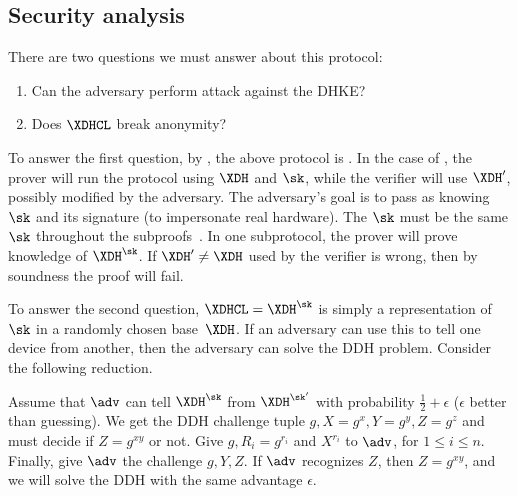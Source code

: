 \subsection{Security analysis}

There are two questions we must answer about this protocol:
\begin{enumerate}
  \item\label{DBSHW-MITM} Can the adversary perform  attack against 
    the \ac{DHKE}?
  \item\label{DBSHW-anon} Does \(\XDHCL\) break anonymity?
\end{enumerate}

To answer the first question,
by \textcite{Camenisch-phdthesis}, the above protocol is .
In the case of , the prover will run the protocol using \(\XDH\) and 
\(\sk\), while the verifier will use \(\XDH'\), possibly modified by the 
adversary.
The adversary's goal is to pass as knowing \(\sk\) and its signature (to 
impersonate real hardware).
The \(\sk\) must be the same \(\sk\) throughout the 
subproofs~\cite{Camenisch-phdthesis}.
In one subprotocol, the prover will prove knowledge of \(\XDH^{\sk}\).
If \(\XDH' \neq \XDH\) used by the verifier is wrong, then by soundness the 
proof will fail.

To answer the second question,
\(\XDHCL = \XDH^{\sk}\) is simply a representation of \(\sk\) in a randomly 
chosen base~\(\XDH\).
If an adversary can use this to tell one device from another, then the 
adversary can solve the \ac{DDH} problem.
Consider the following reduction.

Assume that \(\adv\) can tell \(\XDH^{\sk}\) from \(\XDH^{\sk'}\) with 
probability \(\frac{1}{2} + \epsilon\) (\ie \(\epsilon\) better than guessing).
We get the \ac{DDH} challenge tuple \(g, X = g^x, Y = g^y, Z = g^z\) and must 
decide if \(Z = g^{xy}\) or not.
Give \(g, R_i = g^{r_i}\) and \(X^{r_i}\) to \(\adv\), for \(1\leq i\leq n\).
Finally, give \(\adv\) the challenge \(g, Y, Z\).
If \(\adv\) recognizes \(Z\), then \(Z = g^{xy}\), and we will solve the 
\ac{DDH} with the same advantage \(\epsilon\).
